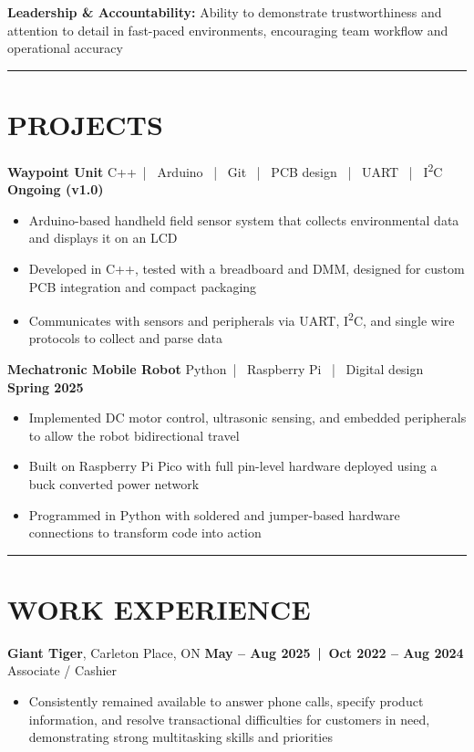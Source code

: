 \documentclass[10pt]{article}
\begin{document}
\textbf{Leadership \& Accountability:} Ability to demonstrate trustworthiness and attention to detail in fast-paced environments, encouraging team workflow and operational accuracy

\vspace{4pt}
\hrule
\vspace{6pt}

\section*{PROJECTS}

\textbf{Waypoint Unit} \hfill C++\, | \, Arduino \, | \, Git \, | \, PCB design \, | \, UART \, | \, I\textsuperscript{2}C \hfill \textbf{Ongoing (v1.0)}
\begin{itemize}
\item Arduino-based handheld field sensor system that collects environmental data and displays it on an LCD
\item Developed in C++, tested with a breadboard and DMM, designed for custom PCB integration and compact packaging
\item Communicates with sensors and peripherals via UART, I\textsuperscript{2}C, and single wire protocols to collect and parse data
\end{itemize}

\textbf{Mechatronic Mobile Robot} \hfill Python\, | \, Raspberry Pi \, | \, Digital design \hfill \textbf{Spring 2025}
\begin{itemize}
\item Implemented DC motor control, ultrasonic sensing, and embedded peripherals to allow the robot bidirectional travel
\item Built on Raspberry Pi Pico with full pin-level hardware deployed using a buck converted power network
\item Programmed in Python with soldered and jumper-based hardware connections to transform code into action
\end{itemize}

\vspace{4pt}
\hrule
\vspace{6pt}

\section*{WORK EXPERIENCE}

\textbf{Giant Tiger}, Carleton Place, ON \hfill \textbf{May -- Aug 2025 \,|\, Oct 2022 -- Aug 2024}\\
Associate / Cashier
\begin{itemize}
\item Consistently remained available to answer phone calls, specify product information, and resolve transactional difficulties for customers in need, demonstrating strong multitasking skills and priorities
\end{itemize}
\end{document}
